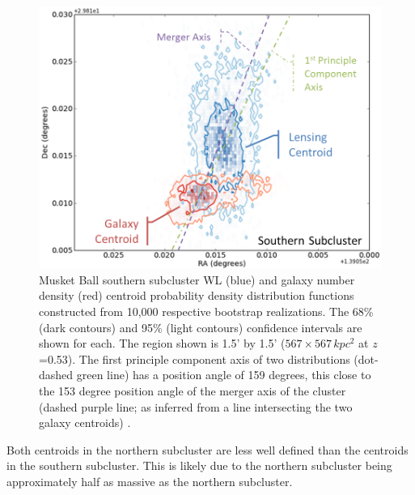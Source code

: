 \begin{figure}
\centering
\includegraphics[width=5in]{Chapter4/AnalysisFiles/southcentroids_histplot2d_reformat.png}
\caption[Musket Ball southern subcluster galaxy and weak lensing centroid spatial distribution.]{
Musket Ball southern subcluster WL (blue) and galaxy number density (red) centroid probability density distribution functions constructed from 10,000 respective bootstrap realizations.
The 68\% (dark contours) and 95\% (light contours) confidence intervals are shown for each.
The region shown is 1.5' by 1.5' ($567\times 567\,kpc^2$ at $z$=0.53).
The first principle component axis of two distributions (dot-dashed green line) has a position angle of 159 degrees, this close to the 153 degree position angle of the merger axis of the cluster (dashed purple line; as inferred from a line intersecting the two galaxy centroids) .
}
\label{figure:CentroidDist_South}
\end{figure}

Both centroids in the northern subcluster are less well defined than the centroids in the southern subcluster.
This is likely due to the northern subcluster being approximately half as massive as the northern subcluster.


